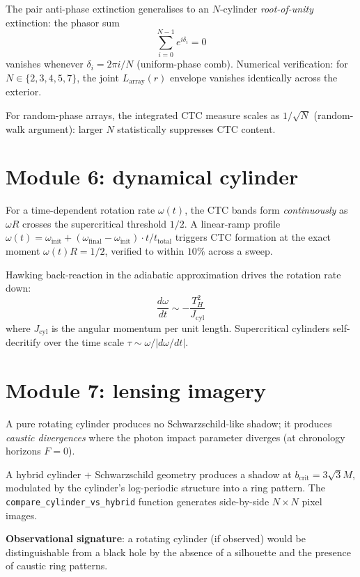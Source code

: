 \documentclass[11pt,a4paper]{article}
\begin{document}
The pair anti-phase extinction \cite{Knopp2026Systrophe}
generalises to an $N$-cylinder \emph{root-of-unity} extinction:
the phasor sum
\[
\sum_{i=0}^{N-1} e^{i \delta_i} = 0
\]
vanishes whenever $\delta_i = 2 \pi i / N$ (uniform-phase comb).
Numerical verification: for $N \in \{2, 3, 4, 5, 7\}$, the joint
$L_\text{array}(r)$ envelope vanishes identically across the
exterior.

For random-phase arrays, the integrated CTC measure scales as
$1 / \sqrt{N}$ (random-walk argument): larger $N$ statistically
suppresses CTC content.

\section{Module 6: dynamical cylinder}

For a time-dependent rotation rate $\omega(t)$, the CTC bands form
\emph{continuously} as $\omega R$ crosses the supercritical
threshold $1/2$. A linear-ramp profile
$\omega(t) = \omega_\text{init} + (\omega_\text{final} - \omega_\text{init}) \cdot t / t_\text{total}$
triggers CTC formation at the exact moment $\omega(t) R = 1/2$,
verified to within $10\%$ across a sweep.

Hawking back-reaction in the adiabatic approximation drives the
rotation rate down:
\[
\frac{d\omega}{dt} \sim -\frac{T_H^2}{J_\text{cyl}}
\]
where $J_\text{cyl}$ is the angular momentum per unit length.
Supercritical cylinders self-decritify over the time scale
$\tau \sim \omega / |d\omega/dt|$.

\section{Module 7: lensing imagery}

A pure rotating cylinder produces no Schwarzschild-like shadow; it
produces \emph{caustic divergences} where the photon impact
parameter diverges (at chronology horizons $F = 0$).

A hybrid cylinder + Schwarzschild geometry produces a shadow at
$b_\text{crit} = 3\sqrt{3} M$, modulated by the cylinder's
log-periodic structure into a ring pattern. The
\texttt{compare\_cylinder\_vs\_hybrid} function generates side-by-side
$N \times N$ pixel images.

\textbf{Observational signature}: a rotating cylinder (if observed)
would be distinguishable from a black hole by the absence of a
silhouette and the presence of caustic ring patterns.
\end{document}
